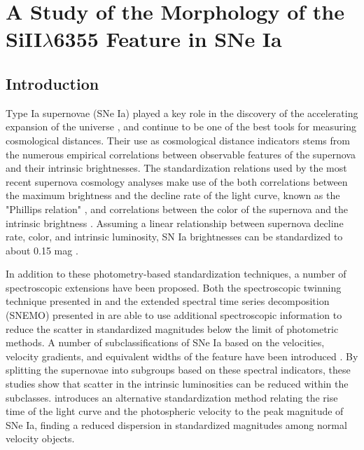 \chapter{A Study of the Morphology of the SiII$\lambda$6355 Feature in SNe Ia}

\section{Introduction}
\label{intro}
Type Ia supernovae (SNe Ia) played a key role in the discovery of the accelerating expansion of the universe \citep{perlmutter_measurements_1999, riess_observational_1998}, and continue to be one of the best tools for measuring cosmological distances. Their use as cosmological distance indicators stems from the numerous empirical correlations between observable features of the supernova and their intrinsic brightnesses. The standardization relations used by the most recent supernova cosmology analyses make use of the both correlations between the maximum brightness and the decline rate of the light curve, known as the "Phillips relation" \citep{phillips_absolute_1993}, and correlations between the color of the supernova and the intrinsic brightness \citep{riess_mlcs_1996, tripp_twoparameter_1998, guy_salt:_2005, guy_salt2:_2007}. Assuming a linear relationship between supernova decline rate, color, and intrinsic luminosity, SN Ia brightnesses can be standardized to about 0.15 mag \citep{betoule_improved_2014}.

In addition to these photometry-based standardization techniques, a number of spectroscopic extensions have been proposed. Both the spectroscopic twinning technique presented in \cite{fakhouri_improving_2015} and the extended spectral time series decomposition (SNEMO) presented in \cite{saunders_improved_2018} are able to use additional spectroscopic information to reduce the scatter in standardized magnitudes below the limit of photometric methods. A number of subclassifications of SNe Ia based on the velocities, velocity gradients, and equivalent widths of the \siliconii feature have been introduced \citep{branch_comparative_2006, benetti_diversity_2005, wang_improved_2009, wang_evidence_2013}. By splitting the supernovae into subgroups based on these spectral indicators, these studies show that scatter in the intrinsic luminosities can be reduced within the subclasses. \cite{zheng_empirical_2018} introduces an alternative standardization method relating the rise time of the light curve and the photospheric velocity to the peak magnitude of SNe Ia, finding a reduced dispersion in standardized magnitudes among normal velocity objects.

